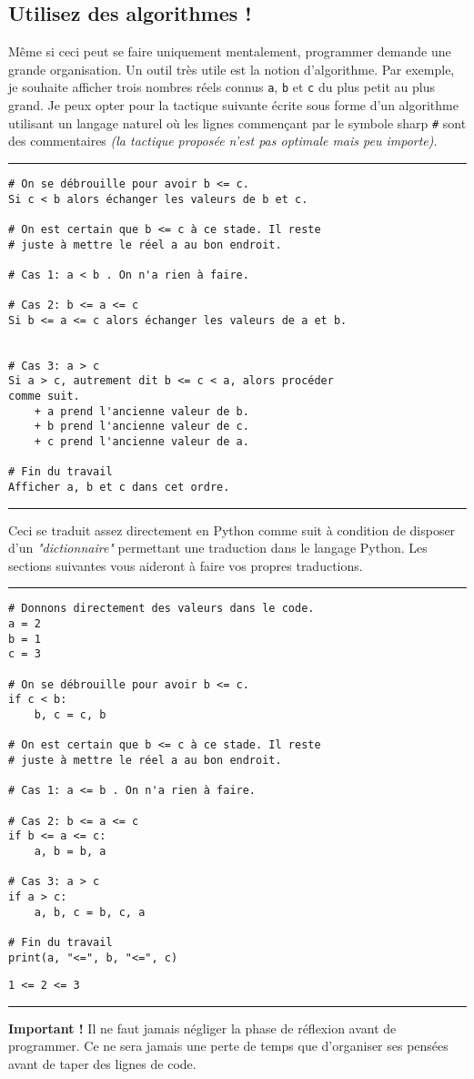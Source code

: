 \subsection{Utilisez des algorithmes !}

Même si ceci peut se faire uniquement mentalement, programmer demande une grande organisation. Un outil très utile est la notion d'algorithme. Par exemple, je souhaite afficher trois nombres réels connus \texttt{a}, \texttt{b} et \texttt{c} du plus petit au plus grand. Je peux opter pour la tactique suivante écrite sous forme d'un algorithme utilisant un langage naturel où les lignes commençant par le symbole sharp \texttt{\#} sont des commentaires \textit{\textit{(la tactique proposée n'est pas optimale mais peu importe)}}.


\bigskip
{\hrule height .5mm}
\begin{verbatim}
# On se débrouille pour avoir b <= c.
Si c < b alors échanger les valeurs de b et c.

# On est certain que b <= c à ce stade. Il reste
# juste à mettre le réel a au bon endroit.

# Cas 1: a < b . On n'a rien à faire.

# Cas 2: b <= a <= c
Si b <= a <= c alors échanger les valeurs de a et b.


# Cas 3: a > c
Si a > c, autrement dit b <= c < a, alors procéder
comme suit.
    + a prend l'ancienne valeur de b.
    + b prend l'ancienne valeur de c.
    + c prend l'ancienne valeur de a.

# Fin du travail
Afficher a, b et c dans cet ordre.
\end{verbatim}
{\hrule height .5mm}
\bigskip


Ceci se traduit assez directement en Python comme suit à condition de disposer d'un \textit{"dictionnaire"} permettant une traduction dans le langage Python. Les sections suivantes vous aideront à faire vos propres traductions.


\bigskip
{\hrule height .5mm}
\begin{verbatim}
# Donnons directement des valeurs dans le code.
a = 2
b = 1
c = 3

# On se débrouille pour avoir b <= c.
if c < b:
    b, c = c, b

# On est certain que b <= c à ce stade. Il reste
# juste à mettre le réel a au bon endroit.

# Cas 1: a <= b . On n'a rien à faire.

# Cas 2: b <= a <= c
if b <= a <= c:
    a, b = b, a

# Cas 3: a > c
if a > c:
    a, b, c = b, c, a

# Fin du travail
print(a, "<=", b, "<=", c)
\end{verbatim}
 \color{ForestGreen}
\vspace{-1.5em}
\begin{verbatim}
1 <= 2 <= 3
\end{verbatim} \color{Black}
{\hrule height .5mm}
\bigskip


\textbf{Important !} Il ne faut jamais négliger la phase de réflexion avant de programmer. Ce ne sera jamais une perte de temps que d'organiser ses pensées avant de taper des lignes de code.